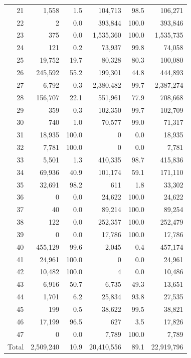 \begin{table}[htbp]
\begin{tabular}{r rr rr r}
21  &     1{,}558   &  1.5 &   104{,}713 & 98.5 &    106{,}271   \\
22  &         2     &  0.0 &   393{,}844 &100.0 &    393{,}846   \\
23  &       375     &  0.0 & 1{,}535{,}360 &100.0 & 1{,}535{,}735 \\
24  &       121     &  0.2 &    73{,}937 & 99.8 &     74{,}058   \\
25  &    19{,}752   & 19.7 &    80{,}328 & 80.3 &    100{,}080   \\
26  &   245{,}592   & 55.2 &   199{,}301 & 44.8 &    444{,}893   \\
27  &     6{,}792   &  0.3 & 2{,}380{,}482 & 99.7 & 2{,}387{,}274 \\
28  &   156{,}707   & 22.1 &   551{,}961 & 77.9 &    708{,}668   \\
29  &       359     &  0.3 &   102{,}350 & 99.7 &    102{,}709   \\
30  &       740     &  1.0 &    70{,}577 & 99.0 &     71{,}317   \\
31  &    18{,}935   &100.0 &         0   &  0.0 &     18{,}935   \\
32  &     7{,}781   &100.0 &         0   &  0.0 &      7{,}781   \\
33  &     5{,}501   &  1.3 &   410{,}335 & 98.7 &    415{,}836   \\
34  &    69{,}936   & 40.9 &   101{,}174 & 59.1 &    171{,}110   \\
35  &    32{,}691   & 98.2 &       611   &  1.8 &     33{,}302   \\
36  &         0     &  0.0 &    24{,}622 &100.0 &     24{,}622   \\
37  &        40     &  0.0 &    89{,}214 &100.0 &     89{,}254   \\
38  &       122     &  0.0 &   252{,}357 &100.0 &    252{,}479   \\
39  &         0     &  0.0 &    17{,}786 &100.0 &     17{,}786   \\
40  &   455{,}129   & 99.6 &     2{,}045 &  0.4 &    457{,}174   \\
41  &    24{,}961   &100.0 &         0   &  0.0 &     24{,}961   \\
42  &    10{,}482   &100.0 &         4   &  0.0 &     10{,}486   \\
43  &     6{,}916   & 50.7 &     6{,}735 & 49.3 &     13{,}651   \\
44  &     1{,}701   &  6.2 &    25{,}834 & 93.8 &     27{,}535   \\
45  &       199     &  0.5 &    38{,}622 & 99.5 &     38{,}821   \\
46  &    17{,}199   & 96.5 &       627   &  3.5 &     17{,}826   \\
47  &         0     &  0.0 &     7{,}789 &100.0 &      7{,}789   \\
\midrule
Total & 2{,}509{,}240 & 10.9 & 20{,}410{,}556 & 89.1 & 22{,}919{,}796 \\
\bottomrule
\end{tabular}
\label{tab:exposure_prefecture}
\end{table}